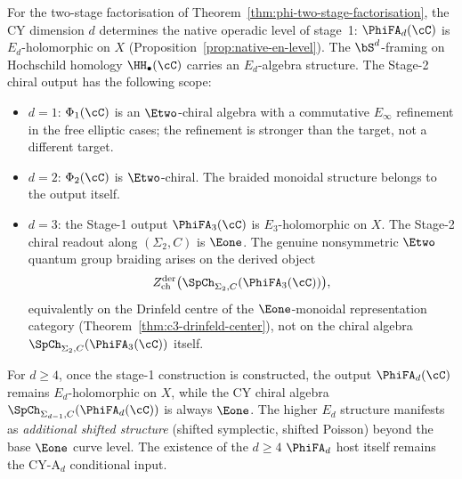 For the two-stage factorisation of Theorem~\ref{thm:phi-two-stage-factorisation},
the CY dimension $d$ determines the native operadic level of stage~1:
$\PhiFA_d(\cC)$ is $E_d$-holomorphic on $X$
(Proposition~\ref{prop:native-en-level}).
The $\bS^d$-framing on Hochschild homology $\HH_\bullet(\cC)$ carries an $E_d$-algebra structure. The Stage-2 chiral output has the following scope:
\begin{itemize}
 \item $d = 1$: $\Phi_1(\cC)$ is an $\Etwo$-chiral algebra with a commutative $E_\infty$ refinement in the free elliptic cases; the refinement is stronger than the target, not a different target.
 \item $d = 2$: $\Phi_2(\cC)$ is $\Etwo$-chiral. The braided monoidal structure belongs to the output itself.
 \item $d = 3$: the Stage-1 output $\PhiFA_3(\cC)$ is $E_3$-holomorphic on $X$. The Stage-2 chiral readout along $(\Sigma_2,C)$ is $\Eone$. The genuine nonsymmetric $\Etwo$ quantum group braiding arises on the derived object
 \[
  Z^{\mathrm{der}}_{\mathrm{ch}}\bigl(\SpCh_{\Sigma_2,C}(\PhiFA_3(\cC))\bigr),
 \]
 equivalently on the Drinfeld centre of the $\Eone$-monoidal representation category (Theorem~\ref{thm:c3-drinfeld-center}), not on the chiral algebra $\SpCh_{\Sigma_2,C}(\PhiFA_3(\cC))$ itself.
\end{itemize}

For $d \geq 4$, once the stage-1 construction is constructed, the output
$\PhiFA_d(\cC)$ remains $E_d$-holomorphic on $X$, while the CY chiral algebra
$\SpCh_{\Sigma_{d-1},C}(\PhiFA_d(\cC))$ is always $\Eone$. The higher
$E_d$ structure manifests as \emph{additional shifted structure}
(shifted symplectic, shifted Poisson) beyond the base $\Eone$ curve
level. The existence of the \(d\geq4\) \(\PhiFA_d\) host itself remains
the CY-A$_d$ conditional input.

